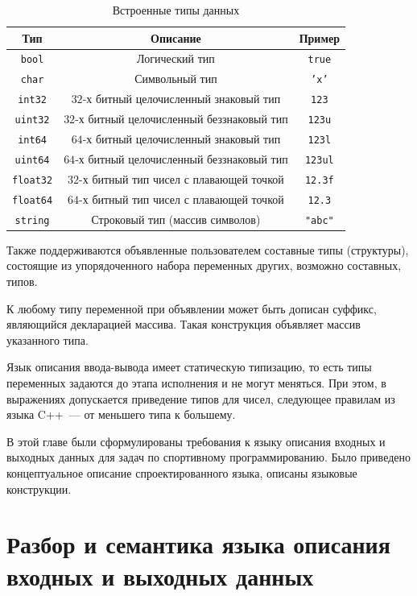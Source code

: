 \documentclass[times,specification,annotation]{style/itmo-student-thesis/itmo-student-thesis}
\begin{document}
\begin{table}[!h]
\caption{Встроенные типы данных}\label{predefined-types}
\centering
\begin{tabular}{|*{3}{c|}}\hline
Тип & Описание & Пример\\\hline
\texttt{bool} & Логический тип & \texttt{true} \\\hline
\texttt{char} & Символьный тип & \texttt{'x'}\\\hline
\texttt{int32} & $32$-х битный целочисленный знаковый тип & \texttt{123} \\\hline
\texttt{uint32} & $32$-х битный целочисленный беззнаковый тип & \texttt{123u} \\\hline
\texttt{int64} & $64$-х битный целочисленный знаковый тип & \texttt{123l} \\\hline
\texttt{uint64} & $64$-х битный целочисленный беззнаковый тип & \texttt{123ul} \\\hline
\texttt{float32} & $32$-х битный тип чисел с плавающей точкой & \texttt{12.3f} \\\hline
\texttt{float64} & $64$-х битный тип чисел с плавающей точкой & \texttt{12.3} \\\hline
\texttt{string} & Строковый тип (массив символов) & \texttt{"abc"} \\\hline
\end{tabular}
\end{table}

Также поддерживаются объявленные пользователем составные типы (структуры), состоящие из упорядоченного набора переменных других, возможно составных, типов.

К любому типу переменной при объявлении может быть дописан суффикс, являющийся декларацией массива. Такая конструкция объявляет массив указанного типа.

Язык описания ввода-вывода имеет статическую типизацию, то есть типы переменных задаются до этапа исполнения и не могут меняться. При этом, в выражениях допускается приведение типов для чисел, следующее правилам из языка C++~--- от меньшего типа к большему.

\chapterconclusion

В этой главе были сформулированы требования к языку описания входных и выходных данных для задач по спортивному программированию. Было приведено концептуальное описание спроектированного языка, описаны языковые конструкции.

\chapter{Разбор и семантика языка описания входных и выходных данных}
\end{document}
